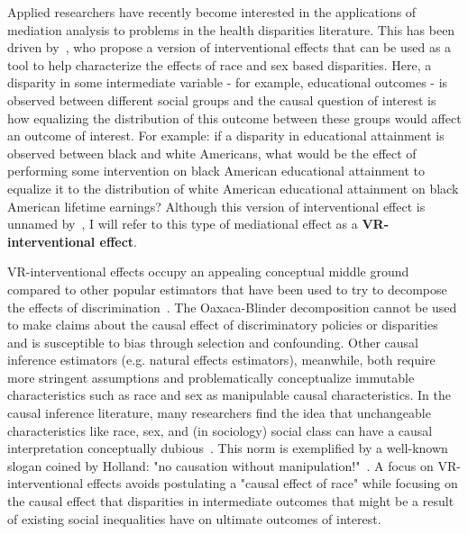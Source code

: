 \documentclass[11pt]{article} %
\numberwithin{equation}{section} %
\begin{document}
Applied researchers have recently become interested in the applications of mediation analysis to problems in the health disparities literature. This has been driven by~\cite{vanderweelerobinson2014}, who propose a version of interventional effects that can be used as a tool to help characterize the effects of race and sex based disparities. Here, a disparity in some intermediate variable - for example, educational outcomes - is observed between different social groups and the causal question of interest is how equalizing the distribution of this outcome between these groups would affect an outcome of interest. For example: if a disparity in educational attainment is observed between black and white Americans, what would be the effect of performing some intervention on black American educational attainment to equalize it to the distribution of white American educational attainment on black American lifetime earnings? Although this version of interventional effect is unnamed by~\cite{vanderweelerobinson2014}, I will refer to this type of mediational effect as a \textbf{VR-interventional effect}. 

VR-interventional effects occupy an appealing conceptual middle ground compared to other popular estimators that have been used to try to decompose the effects of discrimination~\citep{jacksonvanderweele2018, jackson2021}. The Oaxaca-Blinder decomposition cannot be used to make claims about the causal effect of discriminatory policies or disparities and is susceptible to bias through selection and confounding. Other causal inference estimators (e.g. natural effects estimators), meanwhile, both require more stringent assumptions and problematically conceptualize immutable characteristics such as race and sex as manipulable causal characteristics. In the causal inference literature, many researchers find the idea that unchangeable characteristics like race, sex, and (in sociology) social class can have a causal interpretation conceptually dubious~\citep{imbens2015}. This norm is exemplified by a well-known slogan coined by Holland: "no causation without manipulation!"~\citep{holland1986}. A focus on VR-interventional effects avoids postulating a "causal effect of race" while focusing on the causal effect that disparities in intermediate outcomes that might be a result of existing social inequalities have on ultimate outcomes of interest. 
\end{document}

